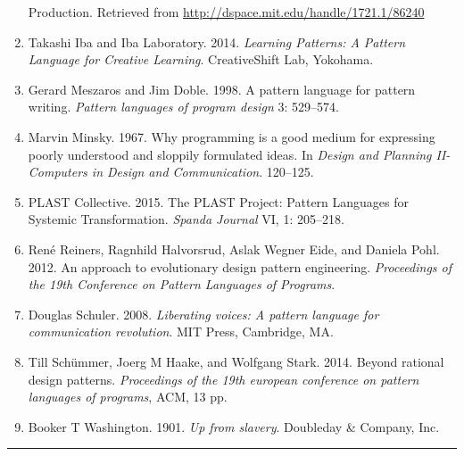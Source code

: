 \begin{enumerate}
  Production. Retrieved from
  \url{http://dspace.mit.edu/handle/1721.1/86240}
\item
  Takashi Iba and Iba Laboratory. 2014. \emph{Learning Patterns: A
  Pattern Language for Creative Learning}. CreativeShift Lab, Yokohama.
\item
  Gerard Meszaros and Jim Doble. 1998. A pattern language for pattern
  writing. \emph{Pattern languages of program design} 3: 529--574.
\item
  Marvin Minsky. 1967. Why programming is a good medium for expressing
  poorly understood and sloppily formulated ideas. In \emph{Design and
  Planning II-Computers in Design and Communication}. 120--125.
\item
  PLAST Collective. 2015. The PLAST Project: Pattern Languages for
  Systemic Transformation. \emph{Spanda Journal} VI, 1: 205--218.
\item
  René Reiners, Ragnhild Halvorsrud, Aslak Wegner Eide, and Daniela
  Pohl. 2012. An approach to evolutionary design pattern engineering.
  \emph{Proceedings of the 19th Conference on Pattern Languages of
  Programs}.
\item
  Douglas Schuler. 2008. \emph{Liberating voices: A pattern language for
  communication revolution}. MIT Press, Cambridge, MA.
\item
  Till Schümmer, Joerg M Haake, and Wolfgang Stark. 2014. Beyond
  rational design patterns. \emph{Proceedings of the 19th european
  conference on pattern languages of programs}, ACM, 13 pp.
\item
  Booker T Washington. 1901. \emph{Up from slavery}. Doubleday \&
  Company, Inc.
\end{enumerate}

\begin{center}\rule{0.5\linewidth}{0.5pt}\end{center}
